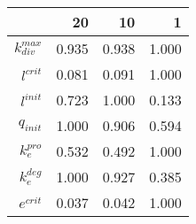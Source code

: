 \begin{tabular}{r| r r r }
&20 &10 &1 \\
\hline 
$k_{div}^{max}$& 0.935 & 0.938 & 1.000 \\
$l^{crit}$& 0.081 & 0.091 & 1.000 \\
$l^{init}$& 0.723 & 1.000 & 0.133 \\
$q_{init}$& 1.000 & 0.906 & 0.594 \\
$k_{e}^{pro}$& 0.532 & 0.492 & 1.000 \\
$k_{e}^{deg}$& 1.000 & 0.927 & 0.385 \\
$e^{crit}$& 0.037 & 0.042 & 1.000 \\
\end{tabular}
